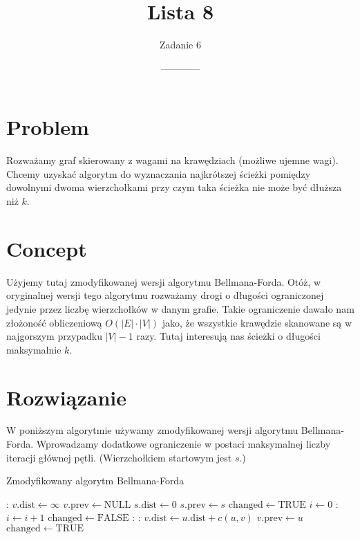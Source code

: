\documentclass[14pt]{article}
\title{Lista 8}
\author{Zadanie 6}
\date{------------}
\begin{document}
\maketitle

\section{Problem}

Rozważamy graf skierowany z wagami na krawędziach (możliwe ujemne wagi). Chcemy uzyskać algorytm do wyznaczania najkrótszej ścieżki pomiędzy dowolnymi dwoma wierzchołkami przy czym taka ścieżka nie może być dłuższa niż $k$.

\section{Concept}

Użyjemy tutaj zmodyfikowanej wersji algorytmu Bellmana-Forda. Otóż, w oryginalnej wersji tego algorytmu rozważamy drogi o długości ograniczonej jedynie przez liczbę wierzchołków w danym grafie. Takie ograniczenie dawało nam złożoność obliczeniową $O(|E|\cdot|V|)$ jako, że wszystkie krawędzie skanowane są w najgorszym przypadku $|V| - 1$ razy. Tutaj interesują nas ścieżki o długości maksymalnie $k$.

\section{Rozwiązanie}

W poniższym algorytmie używamy zmodyfikowanej wersji algorytmu Bellmana-Forda. Wprowadzamy dodatkowe ograniczenie w postaci maksymalnej liczby iteracji głównej pętli. (Wierzchołkiem startowym jest $s$.)

\begin{algorithm}[H]
  \caption{Zmodyfikowany algorytm Bellmana-Forda}
  \begin{algorithmic}[1]
    :
      \State $v.\mathrm{dist} \gets \infty$
      \State $v.\mathrm{prev} \gets \mathrm{NULL}$
    \EndFor
    \State $s.\mathrm{dist} \gets 0$
    \State $s.\mathrm{prev} \gets s$
    \State $\mathrm{changed} \gets \mathrm{TRUE}$
    \State $i \gets 0$
    \Repeat:
      \State $i \gets i + 1$
      \State $\mathrm{changed} \gets \mathrm{FALSE}$
      :
        :
          \State $v.\mathrm{dist} \gets u.\mathrm{dist} + c(u,v)$
          \State $v.\mathrm{prev} \gets u$
          \State $\mathrm{changed} \gets \mathrm{TRUE}$
        \EndIf
      \EndFor
    \label{modified-alg-line}
  \end{algorithmic}
\end{algorithm}
\end{document}

